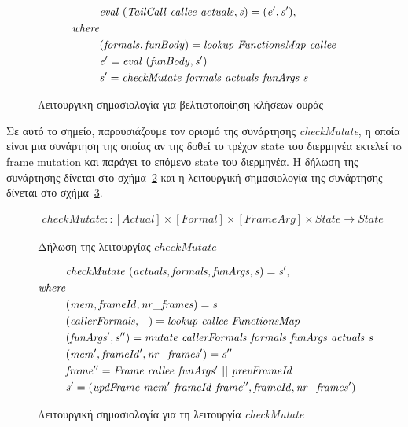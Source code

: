 \documentclass[diploma]{softlab-thesis}
\begin{document}
\begin{figure}[h]
  \begin{align*}
    & \mathit{eval \hfill\ (TailCall \hfill\ callee \hfill\ actuals, s) = (e', s'),} \\
    \mathit{where} \\
    & \mathit{(formals, funBody) = lookup \hfill\ FunctionsMap \hfill\ callee} \\
    & \mathit{e' = eval \hfill\ (funBody, s')} \\
    & \mathit{s' = checkMutate \hfill\ formals \hfill\ actuals \hfill\ funArgs \hfill\ s} 
  \end{align*}
\caption{Λειτουργική σημασιολογία για βελτιστοποίηση κλήσεων ουράς\label{fig:tco-el}}
\end{figure}


Σε αυτό το σημείο, παρουσιάζουμε τον ορισμό της συνάρτησης \textit{checkMutate}, η οποία 
είναι μια συνάρτηση της οποίας αν της δοθεί το τρέχον state του διερμηνέα εκτελεί τo frame mutation 
και παράγει το επόμενο state του διερμηνέα. Η δήλωση της συνάρτησης δίνεται στο σχήμα~\ref{fig:checkdecl-el} 
και η λειτουργική σημασιολογία της συνάρτησης δίνεται στο σχήμα~\ref{fig:checkMutate-el}.

\begin{figure}[h]
  \begin{align*}
    \mathit{checkMutate :: [Actual] \times [Formal] \times [FrameArg] \times State \rightarrow State} 
  \end{align*}
\caption{Δήλωση της λειτουργίας $\mathit{checkMutate}$\label{fig:checkdecl-el}}
\end{figure}

 

\begin{figure}[h]
  \begin{align*}
    & \mathit{checkMutate \hfill\ (actuals, formals, funArgs, s) = s', } \\
    \mathit{where } \\
    & \mathit{(mem, frameId, nr\_frames) = s} \\
    & \mathit{(callerFormals, \_) = lookup \hfill\ callee \hfill\ FunctionsMap} \\
    & \mathit{(funArgs', s'') = mutate \hfill\ callerFormals \hfill\ formals \hfill\ funArgs \hfill\ actuals \hfill\ s } \\
    & \mathit{(mem', frameId', nr\_frames') = s''} \\
    & \mathit{frame'' = Frame \hfill\ callee \hfill\ funArgs' \hfill\ [] \hfill\ prevFrameId} \\
    & \mathit{s' = (updFrame \hfill\ mem' \hfill\ frameId \hfill\ frame'', frameId, nr\_frames')}
  \end{align*}
\caption{Λειτουργική σημασιολογία για τη λειτουργία \textit{checkMutate}\label{fig:checkMutate-el}}
\end{figure}
\end{document}
